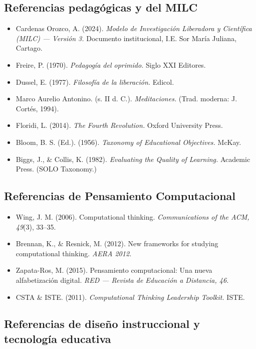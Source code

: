 \documentclass[12pt, a4paper]{article}
\begin{document}
\subsection{Referencias pedagógicas y del MILC}

\begin{itemize}
  \item Cardenas Orozco, A. (2024). \textit{Modelo de Investigación Liberadora
    y Científica (MILC) — Versión 3.} Documento institucional, I.E. Sor María
    Juliana, Cartago.
  \item Freire, P. (1970). \textit{Pedagogía del oprimido.} Siglo XXI Editores.
  \item Dussel, E. (1977). \textit{Filosofía de la liberación.} Edicol.
  \item Marco Aurelio Antonino. (s. II d. C.). \textit{Meditaciones.}
    (Trad. moderna: J. Cortés, 1994).
  \item Floridi, L. (2014). \textit{The Fourth Revolution.} Oxford University Press.
  \item Bloom, B. S. (Ed.). (1956). \textit{Taxonomy of Educational Objectives.} McKay.
  \item Biggs, J., \& Collis, K. (1982). \textit{Evaluating the Quality of Learning.}
    Academic Press. (SOLO Taxonomy.)
\end{itemize}

\subsection{Referencias de Pensamiento Computacional}

\begin{itemize}
  \item Wing, J. M. (2006). Computational thinking. \textit{Communications of the
    ACM, 49}(3), 33–35.
  \item Brennan, K., \& Resnick, M. (2012). New frameworks for studying computational
    thinking. \textit{AERA 2012.}
  \item Zapata-Ros, M. (2015). Pensamiento computacional: Una nueva alfabetización
    digital. \textit{RED — Revista de Educación a Distancia, 46.}
  \item CSTA \& ISTE. (2011). \textit{Computational Thinking Leadership Toolkit.} ISTE.
\end{itemize}

\subsection{Referencias de diseño instruccional y tecnología educativa}
\end{document}
